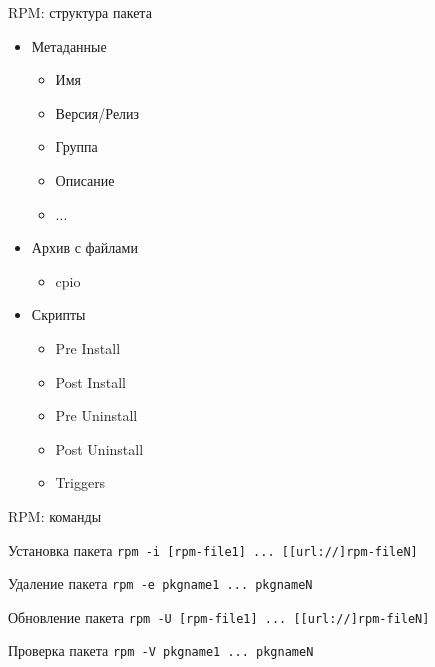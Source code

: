 \documentclass[ignorenonframetext, professionalfonts, hyperref={pdftex, unicode}]{beamer}
\begin{document}
\begin{frame}{RPM: структура пакета}
	\begin{itemize}
		\item Метаданные
			\begin{itemize}
				\item Имя
				\item Версия/Релиз
				\item Группа
				\item Описание
				\item ...
			\end{itemize}
		\item Архив с файлами
			\begin{itemize}
				\item cpio
			\end{itemize}
		\item Скрипты
			\begin{itemize}
				\item Pre Install
				\item Post Install
				\item Pre Uninstall
				\item Post Uninstall \bigskip
				\item Triggers
			\end{itemize}
	\end{itemize}
\end{frame}

\begin{frame}{RPM: команды}
	\begin{block}{Установка пакета}
		{\tt rpm -i [rpm-file1] ... [[url://]rpm-fileN] }
	\end{block}
	\begin{block}{Удаление пакета}
		{\tt rpm -e pkgname1 ... pkgnameN }
	\end{block}
	\begin{block}{Обновление пакета}
		{\tt rpm -U [rpm-file1] ... [[url://]rpm-fileN] }
	\end{block}
	\begin{block}{Проверка пакета}
		{\tt rpm -V pkgname1 ... pkgnameN }
	\end{block}
\end{frame}
\end{document}
